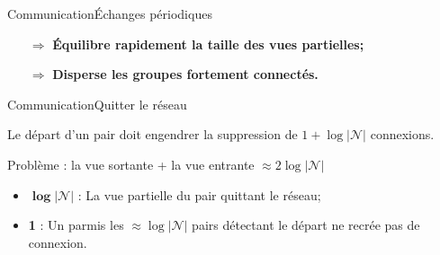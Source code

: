 \begin{frame}{Communication}{Échanges périodiques}
  \vspace{0.5cm}
  \large
  \begin{itemize}
  \item [$\Rightarrow$] \textbf{Équilibre rapidement la taille des vues
      partielles;}
  \item [$\Rightarrow$] \textbf{Disperse les groupes fortement connectés.}
  \end{itemize}
  
\end{frame}

\begin{frame}{Communication}{Quitter le réseau}

  Le départ d'un pair doit engendrer la suppression de $1+\log|\mathcal{N}|$ connexions.

  \vspace{0.5cm}

  Problème : la vue sortante + la vue entrante $\approx 2\log|\mathcal{N}|$
  \begin{itemize}
  \item $\pmb{\log|\mathcal{N}|}$ : La vue partielle du pair quittant le réseau;
  \item \textbf{1} : Un parmis les $\approx \log|\mathcal{N}|$ pairs détectant
    le départ ne recrée pas de connexion.
  \end{itemize}

  \vspace{0.5cm}\hspace{-1cm}
  \begin{minipage}{0.32\textwidth}
    \begin{center}
      
    \end{center}
  \end{minipage}
  \hspace{0.45cm}
  \begin{minipage}{0.32\textwidth}
    \begin{center}
      
    \end{center}
  \end{minipage}
  \hspace{0.45cm}
  \begin{minipage}{0.32\textwidth}
    \begin{center}
      
    \end{center}
  \end{minipage}




\end{frame}
